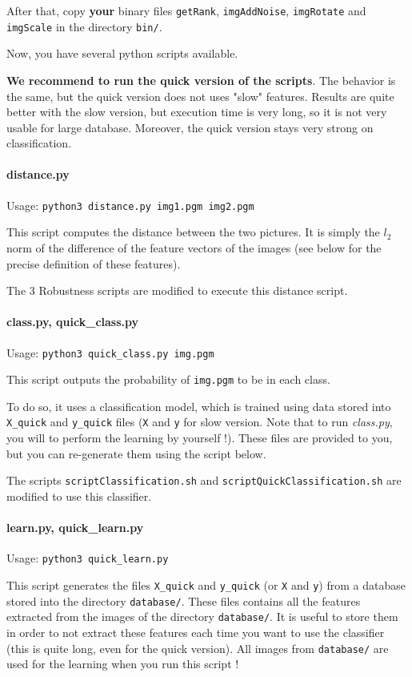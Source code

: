 \documentclass[12pt]{article}
\begin{document}
After that, copy \textbf{your} binary files \texttt{getRank}, \texttt{imgAddNoise}, \texttt{imgRotate} and \texttt{imgScale} in the directory \texttt{bin/}.

Now, you have several python scripts available.

\textbf{We recommend to run the quick version of the scripts}. The behavior is the same, but the quick version does not uses "slow" features. Results are quite better with the slow version, but execution time is very long, so it is not very usable for large database. Moreover, the quick version stays very strong on classification.

\paragraph{distance.py} Usage: \texttt{python3 distance.py img1.pgm img2.pgm}

This script computes the distance between the two pictures. It is simply the $l_2$ norm of the difference of the feature vectors of the images (see below for the precise definition of these features).

The 3 Robustness scripts are modified to execute this distance script.

\paragraph{class.py, quick\_class.py}
Usage: \texttt{python3 quick\_class.py img.pgm}

This script outputs the probability of \texttt{img.pgm} to be in each class. 

To do so, it uses a classification model, which is trained using data stored into \texttt{X\_quick} and \texttt{y\_quick} files (\texttt{X} and \texttt{y} for slow version. 
Note that to run \textit{class.py}, you will to perform the learning by yourself !). These files are provided to you, but you can re-generate them using the script below.

The scripts \texttt{scriptClassification.sh} and \texttt{scriptQuickClassification.sh} are modified to use this classifier.

\paragraph{learn.py, quick\_learn.py}
Usage: \texttt{python3 quick\_learn.py}

This script generates the files \texttt{X\_quick} and \texttt{y\_quick} (or \texttt{X} and \texttt{y}) from a database stored into the directory \texttt{database/}.
These files contains all the features extracted from the images of the directory \texttt{database/}. It is useful to store them in order to not extract these features each time you want to use the classifier (this is quite long, even for the quick version).
All images from \texttt{database/} are used for the learning when you run this script !
\end{document}
